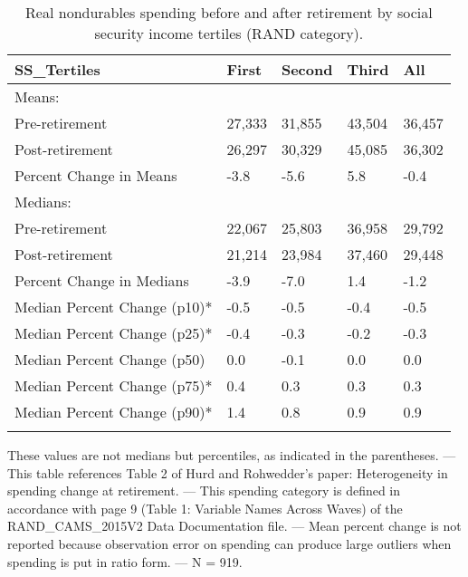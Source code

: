 \begin{table}[tbp] \centering
{}

\caption{Real nondurables spending before and after retirement by social security income tertiles (RAND category).}
\begin{tabularx}{\textwidth}{lCCCC}

\toprule
{SS\_Tertiles}&{First}&{Second}&{Third}&{All} \tabularnewline
\midrule\addlinespace[1.5ex]
Means:&&&& \tabularnewline
\midrule Pre-retirement&27,333&31,855&43,504&36,457 \tabularnewline
Post-retirement&26,297&30,329&45,085&36,302 \tabularnewline
Percent Change in Means&-3.8&-5.6&5.8&-0.4 \tabularnewline
\midrule Medians:&&&& \tabularnewline
\midrule Pre-retirement&22,067&25,803&36,958&29,792 \tabularnewline
Post-retirement&21,214&23,984&37,460&29,448 \tabularnewline
Percent Change in Medians&-3.9&-7.0&1.4&-1.2 \tabularnewline
Median Percent Change (p10)*&-0.5&-0.5&-0.4&-0.5 \tabularnewline
Median Percent Change (p25)*&-0.4&-0.3&-0.2&-0.3 \tabularnewline
Median Percent Change (p50)&0.0&-0.1&0.0&0.0 \tabularnewline
Median Percent Change (p75)*&0.4&0.3&0.3&0.3 \tabularnewline
Median Percent Change (p90)*&1.4&0.8&0.9&0.9 \tabularnewline
\bottomrule \addlinespace[1.5ex]

\end{tabularx}
\begin{flushleft}
\footnotesize *These values are not medians but percentiles, as indicated in the parentheses. \linebreak --- \linebreak This table references Table 2 of Hurd and Rohwedder's paper: Heterogeneity in spending change at retirement. \linebreak --- \linebreak This spending category is defined in accordance with page 9 (Table 1: Variable Names Across Waves) of the RAND\_CAMS\_2015V2 Data Documentation file. \linebreak --- \linebreak Mean percent change is not reported because observation error on spending can produce large outliers when spending is put in ratio form. \linebreak --- \linebreak N = 919.
\end{flushleft}
\end{table}
